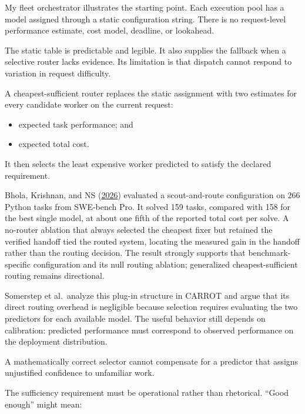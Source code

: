 My fleet orchestrator illustrates the starting point. Each execution pool has a model assigned through a static configuration string. There is no request-level performance estimate, cost model, deadline, or lookahead.

The static table is predictable and legible. It also supplies the fallback when a selective router lacks evidence. Its limitation is that dispatch cannot respond to variation in request difficulty.


A cheapest-sufficient router replaces the static assignment with two estimates for every candidate worker on the current request:

\begin{itemize}
\tightlist
\item
  expected task performance; and
\item
  expected total cost.
\end{itemize}

It then selects the least expensive worker predicted to satisfy the declared requirement.

Bhola, Krishnan, and NS (\href{https://arxiv.org/abs/2608.04804}{2026}) evaluated a scout-and-route configuration on 266 Python tasks from SWE-bench Pro. It solved 159 tasks, compared with 158 for the best single model, at about one fifth of the reported total cost per solve. A no-router ablation that always selected the cheapest fixer but retained the verified handoff tied the routed system, locating the measured gain in the handoff rather than the routing decision. The result strongly supports that benchmark-specific configuration and its null routing ablation; generalized cheapest-sufficient routing remains directional.

Somerstep et al.~analyze this plug-in structure in CARROT and argue that its direct routing overhead is negligible because selection requires evaluating the two predictors for each available model. The useful behavior still depends on calibration: predicted performance must correspond to observed performance on the deployment distribution.

A mathematically correct selector cannot compensate for a predictor that assigns unjustified confidence to unfamiliar work.


The sufficiency requirement must be operational rather than rhetorical. ``Good enough'' might mean:

